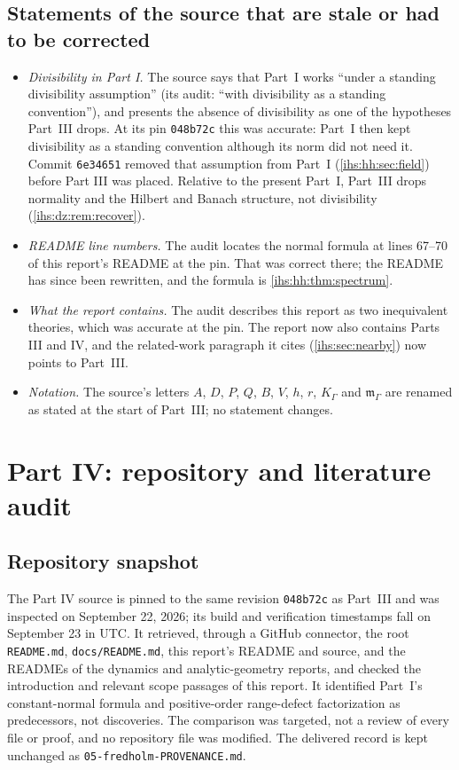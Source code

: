 \documentclass[11pt,a4paper]{article}
\numberwithin{equation}{section}
\theoremstyle{definition}
\theoremstyle{remark}
\begin{document}
\subsection{Statements of the source that are stale or had to be corrected}\label{ihs:app:staleC}
\begin{itemize}
\item \emph{Divisibility in Part I.} The source says that Part~I works
 ``under a standing divisibility assumption'' (its audit: ``with
 divisibility as a standing convention''), and presents the absence of
 divisibility as one of the hypotheses Part~III drops. At its pin
 \texttt{048b72c} this was accurate: Part~I then kept divisibility as a
 standing convention although its norm did not need it. Commit
 \texttt{6e34651} removed that assumption from Part~I
 (\cref{ihs:hh:sec:field}) before Part III was placed. Relative to the
 present Part~I, Part~III drops normality and the Hilbert and Banach
 structure, not divisibility (\cref{ihs:dz:rem:recover}).
\item \emph{README line numbers.} The audit locates the normal formula at
 lines 67--70 of this report's README at the pin. That was correct there;
 the README has since been rewritten, and the formula is
 \cref{ihs:hh:thm:spectrum}.
\item \emph{What the report contains.} The audit describes this report as two
 inequivalent theories, which was accurate at the pin. The report now also
 contains Parts III and IV, and the related-work paragraph it cites
 (\cref{ihs:sec:nearby}) now points to Part~III.
\item \emph{Notation.} The source's letters $A$, $D$, $P$, $Q$, $B$, $V$,
 $h$, $r$, $K_\Gamma$ and $\mathfrak m_\Gamma$ are renamed as stated at the
 start of Part~III; no statement changes.
\end{itemize}

\section{Part IV: repository and literature audit}\label{ihs:app:auditD}

\subsection{Repository snapshot}\label{ihs:app:snapshotD}
The Part IV source is pinned to the same revision \texttt{048b72c} as
Part~III and was inspected on September 22, 2026; its build and verification
timestamps fall on September 23 in UTC. It retrieved, through a GitHub
connector, the root \texttt{README.md}, \texttt{docs/README.md}, this
report's README and source, and the READMEs of the dynamics and
analytic-geometry reports, and checked the introduction and relevant scope
passages of this report. It identified Part~I's constant-normal formula and
positive-order range-defect factorization as predecessors, not discoveries.
The comparison was targeted, not a review of every file or proof, and no
repository file was modified. The delivered record is kept unchanged as
\texttt{05-fredholm-PROVENANCE.md}.
\end{document}
